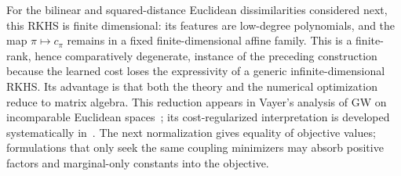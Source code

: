 For the bilinear and squared-distance Euclidean dissimilarities considered next, this RKHS is finite dimensional: its features are low-degree polynomials, and the map $\pi\mapsto c_\pi$ remains in a fixed finite-dimensional affine family. This is a finite-rank, hence comparatively degenerate, instance of the preceding construction because the learned cost loses the expressivity of a generic infinite-dimensional RKHS\@. Its advantage is that both the theory and the numerical optimization reduce to matrix algebra. This reduction appears in Vayer's analysis of GW on incomparable Euclidean spaces~\cite[Chapter~4]{Vayer2020IncomparableSpaces}; its cost-regularized interpretation is developed systematically in~\cite{SebbouhCuturiPeyre2024}. The next normalization gives equality of objective values; formulations that only seek the same coupling minimizers may absorb positive factors and marginal-only constants into the objective.

